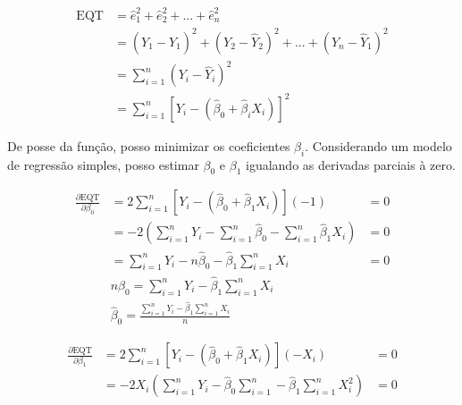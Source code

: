 \begin{apendicesenv}
\begin{equation}
\begin{aligned}
\text{EQT} & = \hat{e}^2_1 + \hat{e}^2_2 + ... + \hat{e}^2_n \\
& = (Y_1 - \hat{Y}_1)^2 + (Y_2 - \hat{Y}_2)^2 + ... + (Y_n - \hat{Y}_1)^2 \\
& = \sum_{i=1}^{n}(Y_i - \hat{Y}_i)^2 \\
& = \sum_{i=1}^{n}[Y_i - (\hat{\beta}_0 + \hat{\beta}_iX_i)]^2
\end{aligned}
\end{equation}

De posse da função, posso minimizar os coeficientes $\beta_i$. Considerando um modelo de regressão simples, posso estimar $\beta_0$ e $\beta_1$ igualando as derivadas parciais à zero.

\begin{equation}
\begin{aligned}
\frac{\partial \text{EQT}}{\partial \beta_0} & = 2\sum_{i=1}^{n}[Y_i - (\hat{\beta}_0 + \hat{\beta}_1X_i)] (-1) & = 0 \\
& = -2 (\sum_{i=1}^{n} Y_i - \sum_{i=1}^{n} \hat{\beta}_0 - \sum_{i=1}^{n} \hat{\beta}_1X_i) & = 0 \\
& = \sum_{i=1}^{n} Y_i - n\hat{\beta}_0 - \hat{\beta}_1 \sum_{i=1}^{n} X_i & = 0 \\
& n\hat{\beta}_0 = \sum_{i=1}^{n} Y_i - \hat{\beta}_1 \sum_{i=1}^{n} X_i \\
& \hat{\beta}_0 = \frac{\sum_{i=1}^{n} Y_i - \hat{\beta}_1 \sum_{i=1}^{n} X_i}{n}
\end{aligned}
\end{equation}

\begin{equation}
\begin{aligned}
\frac{\partial \text{EQT}}{\partial \beta_1} & = 2\sum_{i=1}^{n}[Y_i - (\hat{\beta}_0 + \hat{\beta}_1X_i)] (-X_i) & = 0 \\
& = -2X_i (\sum_{i=1}^{n} Y_i - \hat{\beta}_0\sum_{i=1}^{n} - \hat{\beta}_1\sum_{i=1}^{n} X_i^2) & = 0 \\
\end{aligned}
\end{equation}


\end{apendicesenv}

%
%
%
